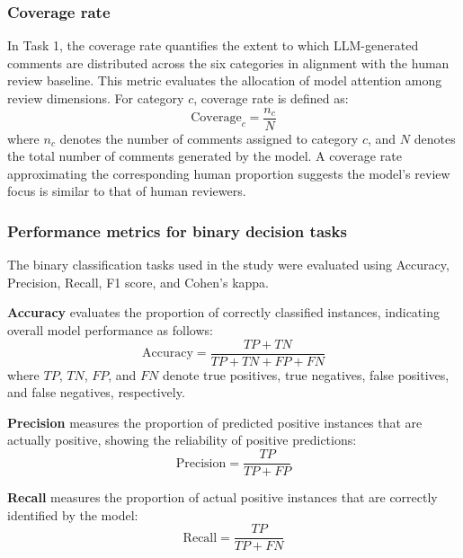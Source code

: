 \documentclass[preprint,10pt,times]{elsarticle}
\begin{document}
\subsubsection{Coverage rate}

In Task 1, the coverage rate quantifies the extent to which LLM-generated comments are distributed across the six categories in alignment with the human review baseline. This metric evaluates the allocation of model attention among review dimensions. For category $c$, coverage rate is defined as:
\begin{equation}
  \mathrm{Coverage}_c = \frac{n_c}{N}
  \label{eq:coverage}
\end{equation}
where $n_c$ denotes the number of comments assigned to category $c$, and $N$ denotes the total number of comments generated by the model. A coverage rate approximating the corresponding human proportion suggests the model's review focus is similar to that of human reviewers.

\subsubsection{Performance metrics for binary decision tasks}

The binary classification tasks used in the study were evaluated using Accuracy, Precision, Recall, F1 score, and Cohen's kappa.

\textbf{Accuracy} evaluates the proportion of correctly classified instances, indicating overall model performance as follows:
\begin{equation}
  \mathrm{Accuracy} = \frac{TP + TN}{TP + TN + FP + FN}
  \label{eq:acc}
\end{equation}
where $TP$, $TN$, $FP$, and $FN$ denote true positives, true negatives, false positives, and false negatives, respectively.

\textbf{Precision} measures the proportion of predicted positive instances that are actually positive, showing the reliability of positive predictions:
\begin{equation}
  \mathrm{Precision} = \frac{TP}{TP + FP}
  \label{eq:prec}
\end{equation}

\textbf{Recall} measures the proportion of actual positive instances that are correctly identified by the model:
\begin{equation}
  \mathrm{Recall} = \frac{TP}{TP + FN}
  \label{eq:rec}
\end{equation}
\end{document}
